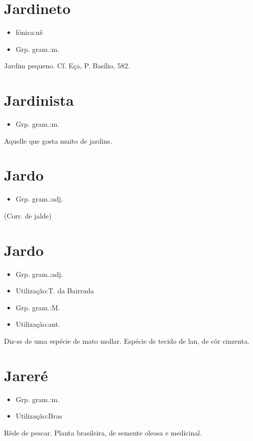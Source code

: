 \documentclass{article}
\begin{document}
\section{Jardineto}
\begin{itemize}
\item {fónica:nê}
\end{itemize}
\begin{itemize}
\item {Grp. gram.:m.}
\end{itemize}
Jardim pequeno. Cf. Eça, \textunderscore P. Basílio\textunderscore , 582.
\section{Jardinista}
\begin{itemize}
\item {Grp. gram.:m.}
\end{itemize}
Aquelle que gosta muito de jardins.
\section{Jardo}
\begin{itemize}
\item {Grp. gram.:adj.}
\end{itemize}
(Corr. de \textunderscore jalde\textunderscore )
\section{Jardo}
\begin{itemize}
\item {Grp. gram.:adj.}
\end{itemize}
\begin{itemize}
\item {Utilização:T. da Bairrada}
\end{itemize}
\begin{itemize}
\item {Grp. gram.:M.}
\end{itemize}
\begin{itemize}
\item {Utilização:ant.}
\end{itemize}
Diz-se de uma espécie de mato mollar.
Espécie de tecido de lan, de côr cinzenta.
\section{Jareré}
\begin{itemize}
\item {Grp. gram.:m.}
\end{itemize}
\begin{itemize}
\item {Utilização:Bras}
\end{itemize}
Rêde de pescar.
Planta brasileira, de semente oleosa e medicinal.
\end{document}
